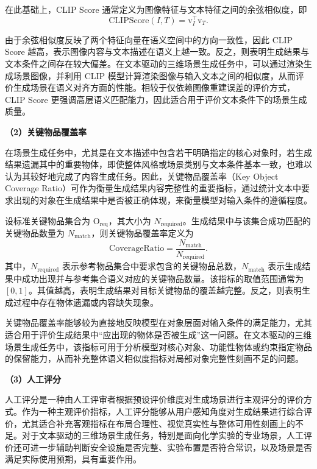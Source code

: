 在此基础上，CLIP Score 通常定义为图像特征与文本特征之间的余弦相似度，即
\begin{equation}
\mathrm{CLIPScore}(I,T) = \text{v}_I^\top \text{v}_T .
\label{eq:clipscore}
\end{equation}

由于余弦相似度反映了两个特征向量在语义空间中的方向一致性，因此 CLIP Score 越高，表示图像内容与文本描述在语义上越一致。反之，则表明生成结果与文本条件之间存在较大偏差。在文本驱动的三维场景生成任务中，可以通过渲染生成场景图像，并利用 CLIP 模型计算渲染图像与输入文本之间的相似度，从而评价生成场景在语义对齐方面的性能。相较于仅依赖图像重建误差的评价方式，CLIP Score 更强调高层语义匹配能力，因此适合用于评价文本条件下的场景生成质量。

\noindent\textbf{（2）关键物品覆盖率}

在场景生成任务中，尤其是在文本描述中包含若干明确指定的核心对象时，若生成结果遗漏其中的重要物体，即使整体风格或场景类别与文本条件基本一致，也难以认为其较好地完成了内容生成任务。因此，关键物品覆盖率（Key Object Coverage Ratio）可作为衡量生成结果内容完整性的重要指标，通过统计文本中要求出现的对象在生成结果中是否被正确体现，来衡量模型对输入条件的遵循程度\cite{lin2024instructscene,bai2025freescene}。

设标准关键物品集合为 $\text{O}_{\mathrm{req}}$，其大小为 $N_{\mathrm{required}}$。生成结果中与该集合成功匹配的关键物品数量为 $N_{\mathrm{match}}$，则关键物品覆盖率定义为
\begin{equation}
\mathrm{CoverageRatio}=
\frac{N_{\mathrm{match}}}{N_{\mathrm{required}}}.
\label{eq:key_object_coverage}
\end{equation}
其中，$N_{\mathrm{required}}$ 表示参考物品集合中要求包含的关键物品总数，$N_{\mathrm{match}}$ 表示生成结果中成功出现并与参考集合语义对应的关键物品数量。该指标的取值范围通常为 $[0,1]$。其值越高，表明生成结果对目标关键物品的覆盖越完整。反之，则表明生成过程中存在物体遗漏或内容缺失现象。

关键物品覆盖率能够较为直接地反映模型在对象层面对输入条件的满足能力，尤其适合用于评价生成结果中“应出现的物体是否被生成”这一问题。在文本驱动的三维场景生成任务中，该指标可用于分析模型对核心对象、功能性物体或约束指定物品的保留能力，从而补充整体语义相似度指标对局部对象完整性刻画不足的问题。

\noindent\textbf{（3）人工评分}

人工评分是一种由人工评审者根据预设评价维度对生成场景进行主观评分的评价方式。作为一种主观评价指标，人工评分能够从用户感知角度对生成结果进行综合评价，尤其适合补充客观指标在布局合理性、视觉真实性与整体可用性刻画上的不足。对于文本驱动的三维场景生成任务，特别是面向化学实验的专业场景，人工评价还可进一步辅助判断安全设施是否完整、实验布置是否符合常识，以及场景是否满足实际使用预期，具有重要作用。



